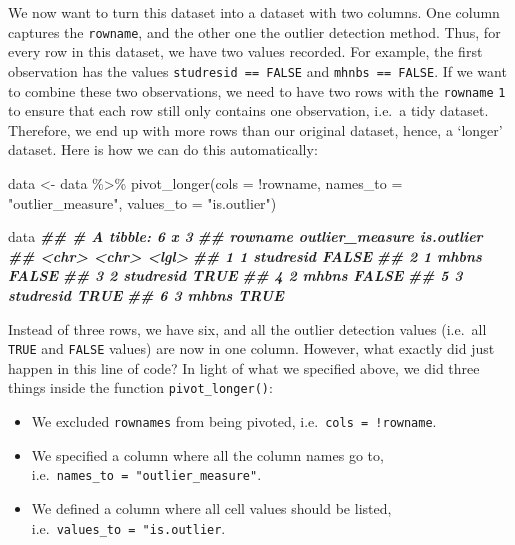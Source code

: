 \documentclass[
]{book}
\newenvironment{Shaded}{\begin{snugshade}}{\end{snugshade}}
\newcommand{\AttributeTok}[1]{\textcolor[rgb]{0.77,0.63,0.00}{#1}}
\newcommand{\DocumentationTok}[1]{\textcolor[rgb]{0.56,0.35,0.01}{\textbf{\textit{#1}}}}
\newcommand{\FunctionTok}[1]{\textcolor[rgb]{0.00,0.00,0.00}{#1}}
\newcommand{\NormalTok}[1]{#1}
\newcommand{\OtherTok}[1]{\textcolor[rgb]{0.56,0.35,0.01}{#1}}
\newcommand{\SpecialCharTok}[1]{\textcolor[rgb]{0.00,0.00,0.00}{#1}}
\newcommand{\StringTok}[1]{\textcolor[rgb]{0.31,0.60,0.02}{#1}}
\begin{document}
We now want to turn this dataset into a dataset with two columns. One column captures the \texttt{rowname}, and the other one the outlier detection method. Thus, for every row in this dataset, we have two values recorded. For example, the first observation has the values \texttt{studresid\ ==\ FALSE} and \texttt{mhnbs\ ==\ FALSE}. If we want to combine these two observations, we need to have two rows with the \texttt{rowname} \texttt{1} to ensure that each row still only contains one observation, i.e.~a tidy dataset. Therefore, we end up with more rows than our original dataset, hence, a `longer' dataset. Here is how we can do this automatically:

\begin{Shaded}
\begin{Highlighting}[]
\NormalTok{data }\OtherTok{\textless{}{-}}\NormalTok{ data }\SpecialCharTok{\%\textgreater{}\%}
  \FunctionTok{pivot\_longer}\NormalTok{(}\AttributeTok{cols =} \SpecialCharTok{!}\NormalTok{rowname,}
               \AttributeTok{names\_to =} \StringTok{"outlier\_measure"}\NormalTok{,}
               \AttributeTok{values\_to =} \StringTok{"is.outlier"}\NormalTok{)}

\NormalTok{data}
\DocumentationTok{\#\# \# A tibble: 6 x 3}
\DocumentationTok{\#\#   rowname outlier\_measure is.outlier}
\DocumentationTok{\#\#   \textless{}chr\textgreater{}   \textless{}chr\textgreater{}           \textless{}lgl\textgreater{}     }
\DocumentationTok{\#\# 1 1       studresid       FALSE     }
\DocumentationTok{\#\# 2 1       mhbns           FALSE     }
\DocumentationTok{\#\# 3 2       studresid       TRUE      }
\DocumentationTok{\#\# 4 2       mhbns           FALSE     }
\DocumentationTok{\#\# 5 3       studresid       TRUE      }
\DocumentationTok{\#\# 6 3       mhbns           TRUE}
\end{Highlighting}
\end{Shaded}

Instead of three rows, we have six, and all the outlier detection values (i.e.~all \texttt{TRUE} and \texttt{FALSE} values) are now in one column. However, what exactly did just happen in this line of code? In light of what we specified above, we did three things inside the function \texttt{pivot\_longer()}:

\begin{itemize}
\item
  We excluded \texttt{rownames} from being pivoted, i.e.~\texttt{cols\ =\ !rowname}.
\item
  We specified a column where all the column names go to, i.e.~\texttt{names\_to\ =\ "outlier\_measure"}.
\item
  We defined a column where all cell values should be listed, i.e.~\texttt{values\_to\ =\ "is.outlier}.
\end{itemize}
\end{document}
